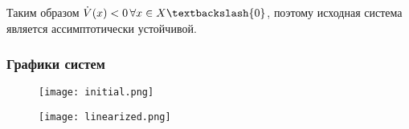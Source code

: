     Таким образом $\dot{V}(x) < 0\, \forall x \in X \textbackslash\{0\}$, поэтому исходная система является
    ассимптотически устойчивой.

    \subsubsection*{Графики систем}

    \begin{figure}[H]
        \centering
        \texttt{[image: initial.png]}
    \end{figure}

    \begin{figure}[H]
        \centering
        \texttt{[image: linearized.png]}
    \end{figure}


